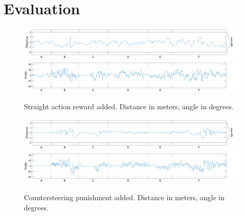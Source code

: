 
\section{Evaluation}\label{sec:evaluation}

\begin{figure}[!t]
\centering
\includegraphics[scale=0.265]{../plots/dist_eval_log_straight_serpentine_06speed}
\vspace{0.5em}
\includegraphics[scale=0.265]{../plots/ang_eval_log_straight_serpentine_06speed}
\vspace{-2.25em}
\caption{Straight action reward added. Distance in meters, angle in degrees.}
\label{straight06}
\vspace{1em}
\includegraphics[scale=0.265]{../plots/dist_eval_log_smooth_serpentine_06speed}
\vspace{0.5em}
\includegraphics[scale=0.265]{../plots/ang_eval_log_smooth_serpentine_06speed}
\vspace{-2.25em}
\caption{Countersteering punishment added. Distance in meters, angle in degrees.}
\label{smooth06}
\end{figure}

